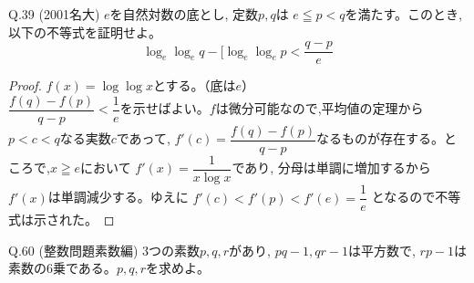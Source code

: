 \documentclass[twocolumn]{jsarticle}
\newcommand{\thm}{\begin{itembox}[l]}
\newcommand{\enthm}{\end{itembox}\\}
\renewcommand{\leq}{\leqq}
\renewcommand{\geq}{\geqq}
\begin{document}
\thm{Q.39 (2001名大)}
$e$を自然対数の底とし, 定数$p,q$は $e\leq p<q$を満たす。このとき,以下の不等式を証明せよ。
\[\log_e{\log_e{q}}-[\log_e{\log_e{p}}<\dfrac{q-p}{e}\]
\end{itembox}
\begin{proof}
$f(x)=\log{\log{x}}$とする。（底は$e$）\\
$\dfrac{f(q)-f(p)}{q-p}<\dfrac{1}{e}$を示せばよい。$f$は微分可能なので,平均値の定理から$p<c<q$なる実数$c$であって, $f'(c)=\dfrac{f(q)-f(p)}{q-p}$なるものが存在する。ところで,$x\geq e$において $f'(x)=\dfrac{1}{x\log{x}}$であり, 分母は単調に増加するから$f'(x)$は単調減少する。ゆえに $f'(c)<f'(p)<f'(e)=\dfrac{1}{e}$ となるので不等式は示された。
\end{proof}
\thm{Q.60 (整数問題素数編)}
3つの素数$p,q,r$があり, $pq-1, qr-1$は平方数で, $rp-1$は素数の6乗である。$p,q,r$を求めよ。
\enthm
\end{document}
